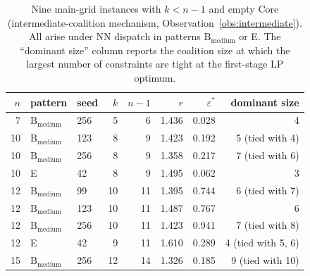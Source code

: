 \documentclass[11pt]{article}
\theoremstyle{plain}
\theoremstyle{definition}
\theoremstyle{remark}
\begin{document}
\begin{table}[h]
\centering
\small
\caption{Nine main-grid instances with $k<n-1$ and empty Core (intermediate-coalition mechanism, Observation~\ref{obs:intermediate}). All arise under NN dispatch in patterns $\text{B}_{\text{medium}}$ or E. The ``dominant size'' column reports the coalition size at which the largest number of constraints are tight at the first-stage LP optimum.}
\label{tab:intermediate}
\begin{tabular}{@{}rllrrrrr@{}}
\toprule
$n$ & pattern & seed & $k$ & $n-1$ & $r$ & $\varepsilon^{\ast}$ & dominant size \\
\midrule
 7 & $\text{B}_{\text{medium}}$ & 256 &  5 &  6 & 1.436 & 0.028 & 4 \\
10 & $\text{B}_{\text{medium}}$ & 123 &  8 &  9 & 1.423 & 0.192 & 5 (tied with 4) \\
10 & $\text{B}_{\text{medium}}$ & 256 &  8 &  9 & 1.358 & 0.217 & 7 (tied with 6) \\
10 & E                          &  42 &  8 &  9 & 1.495 & 0.062 & 3 \\
12 & $\text{B}_{\text{medium}}$ &  99 & 10 & 11 & 1.395 & 0.744 & 6 (tied with 7) \\
12 & $\text{B}_{\text{medium}}$ & 123 & 10 & 11 & 1.487 & 0.767 & 6 \\
12 & $\text{B}_{\text{medium}}$ & 256 & 10 & 11 & 1.423 & 0.941 & 7 (tied with 8) \\
12 & E                          &  42 &  9 & 11 & 1.610 & 0.289 & 4 (tied with 5, 6) \\
15 & $\text{B}_{\text{medium}}$ & 256 & 12 & 14 & 1.326 & 0.185 & 9 (tied with 10) \\
\bottomrule
\end{tabular}
\end{table}
\end{document}
